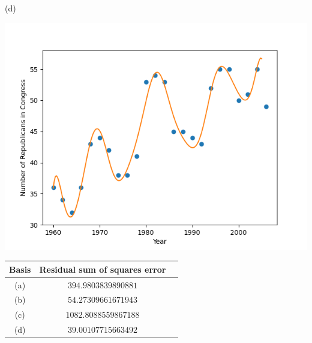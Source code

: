 \documentclass[submit]{harvardml}
\begin{document}
(d)
\begin{center}
    \includegraphics[scale=0.5]{4.1d.png}
\end{center}

\smallskip
\begin{center}
\begin{tabular}{ |c|c|c| } 
 \hline
 Basis & Residual sum of squares error \\ 
 \hline\hline
 (a) & $394.9803839890881$ \\
 \hline
 (b) & $54.27309661671943$ \\ 
 \hline
 (c) & $1082.8088559867188$ \\ 
 \hline
 (d) & $39.00107715663492$ \\ 
 \hline
\end{tabular}
\end{center}
\end{document}
